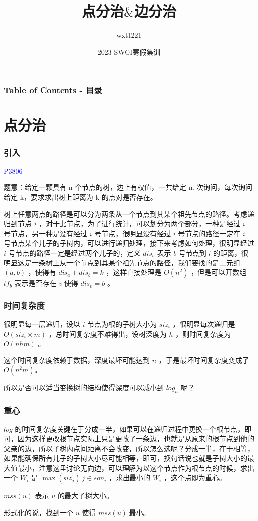 \documentclass[UTF8]{ctexbeamer}
\author{wxt1221}
\date {2023 SWOI寒假集训}
\title{点分治$\&$边分治}
\begin{document}
	\frame{\titlepage}
	\begin{frame}
		\frametitle{Table of Contents - 目录}
		\tableofcontents
	\end{frame}
	\section{点分治}
        \begin{frame}
            \frametitle{引入}
            \href{https://www.luogu.com.cn/problem/P3806}{\textcolor{blue}{P3806}}

            题意：给定一颗具有 n 个节点的树，边上有权值，一共给定 m 次询问，每次询问给定 k，要求求出树上距离为 k 的点对是否存在。
            
            \hspace*{\fill}

            树上任意两点的路径是可以分为两条从一个节点到其某个祖先节点的路径。考虑递归到节点 $i$ ，对于此节点，为了进行统计，可以划分为两个部分，一种是经过 $i$ 号节点，另一种是没有经过 $i$ 号节点，很明显没有经过 $i$ 号节点的路径一定在 $i$ 号节点某个儿子的子树内，可以进行递归处理，接下来考虑如何处理，很明显经过 $i$ 号节点的路径一定是经过两个儿子的，定义 $dis_b$ 表示 $b$ 号节点到 $i$ 的距离，很明显这是一条树上从一个节点到其某个祖先节点的路径，我们要找的是二元组 $(a,b)$ ，使得有 $dis_a + dis_b =k $ ，这样直接处理是 $O(n^2)$ ，但是可以开数组 $tf_b$ 表示是否存在 $v$ 使得 $dis_v=b$ 。
        \end{frame}
        
        \begin{frame}
            \frametitle{时间复杂度}
            很明显每一层递归，设以 $i$ 节点为根的子树大小为 $siz_i$ ，很明显每次递归是 $O(siz_i \times m)$ ，总时间复杂度不难得出，设树深度为 $h$ ，则时间复杂度为 $O(nhm)$ 。

            这个时间复杂度依赖于数据，深度最坏可能达到 $n$ ，于是最坏时间复杂度变成了 $O(n^2m)$。

            所以是否可以适当变换树的结构使得深度可以减小到 $log_n$ 呢？
        \end{frame}
        
        \begin{frame}
            \frametitle{重心}
            $log$ 的时间复杂度关键在于分成一半，如果可以在递归过程中更换一个根节点，即可，因为这样更改根节点实际上只是更改了一条边，也就是从原来的根节点到他的父亲的边，所以子树内点间距离不会改变，所以怎么选呢？分成一半，在于相等，如果能确保所有儿子的子树大小尽可能相等，即可，换句话说也就是子树大小的最大值最小，注意这里讨论无向边，可以理解为以这个节点作为根节点的时候，求出一个 $W_i$ 是 $\max(siz_j)~{j\in son_i}$ ，求出最小的 $W_i$ ，这个点即为重心。

            $mss(u)$ 表示 $u$ 的最大子树大小。

            形式化的说，找到一个 $u$ 使得 $mss(u)$ 最小。
        \end{frame}
\end{document}
